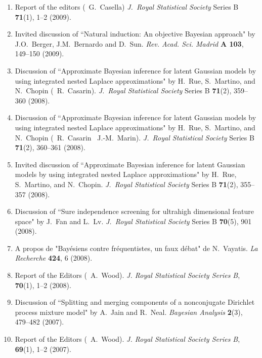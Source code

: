 \begin{enumerate}
\item Report of the editors (\avec\ G.~Casella) {\em J.~Royal Statistical Society} Series B {\bf 71}(1), 1--2 (2009).

\item Invited discussion of ``Natural induction: An objective Bayesian approach" by
J.O.~Berger, J.M.~Bernardo and D.~Sun. {\em Rev. Acad. Sci. Madrid} {\bf A 103}, 149--150 (2009).

\item Discussion of ``Approximate Bayesian inference for latent Gaussian models by using integrated nested Laplace 
approximations" by H.~Rue, S.~Martino, and N.~Chopin (\avec\ R.~Casarin).
{\em J.~Royal Statistical Society} Series B  {\bf 71}(2), 359--360 (2008).

\item Discussion of ``Approximate Bayesian inference for latent Gaussian models by using integrated nested Laplace 
approximations" by H.~Rue, S.~Martino, and N.~Chopin (\avec\ R.~Casarin \et\ J.-M.~Marin).
{\em J.~Royal Statistical Society} Series B {\bf 71}(2), 360--361 (2008).

\item Invited discussion of ``Approximate Bayesian inference for latent Gaussian models by using integrated 
nested Laplace approximations" by H.~Rue, S.~Martino, and N.~Chopin.
{\em J.~Royal Statistical Society} Series B {\bf 71}(2), 355--357 (2008).

\item Discussion of ``Sure independence screening for ultrahigh dimensional feature space" by J.~Fan and L.~Lv.
{\em J.~Royal Statistical Society} Series B {\bf 70}(5), 901 (2008).

\item A propos de "Bay\'esiens contre fr\'equentistes, un faux d\'ebat" de N.~Vayatis. {\em La Recherche} {\bf 424}, 6 (2008).

\item Report of the Editors (\avec\ A.~Wood). {\em J. Royal Statistical Society Series B}, {\bf 70}(1), 1--2 (2008).

\item Discussion of ``Splitting and merging components of a nonconjugate Dirichlet 
process mixture model" by A.~Jain and R.~Neal. {\em Bayesian Analysis} 
{\bf 2}(3), 479--482 (2007).

\item Report of the Editors (\avec\ A.~Wood). {\em J. Royal Statistical Society Series B}, {\bf 69}(1), 1--2 (2007).


\end{enumerate}
